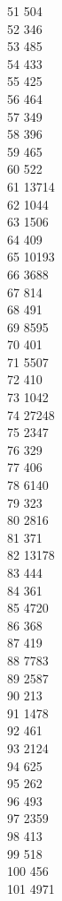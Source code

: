 { 51	504 \\
 52	346 \\
 53	485 \\
 54	433 \\
 55	425 \\
 56	464 \\
 57	349 \\
 58	396 \\
 59	465 \\
 60	522 \\
 61	13714 \\
 62	1044 \\
 63	1506 \\
 64	409 \\
 65	10193 \\
 66	3688 \\
 67	814 \\
 68	491 \\
 69	8595 \\
 70	401 \\
 71	5507 \\
 72	410 \\
 73	1042 \\
 74	27248 \\
 75	2347 \\
 76	329 \\
 77	406 \\
 78	6140 \\
 79	323 \\
 80	2816 \\
 81	371 \\
 82	13178 \\
 83	444 \\
 84	361 \\
 85	4720 \\
 86	368 \\
 87	419 \\
 88	7783 \\
 89	2587 \\
 90	213 \\
 91	1478 \\
 92	461 \\
 93	2124 \\
 94	625 \\
 95	262 \\
 96	493 \\
 97	2359 \\
 98	413 \\
 99	518 \\
 100	456 \\
 101	4971 \\
}
